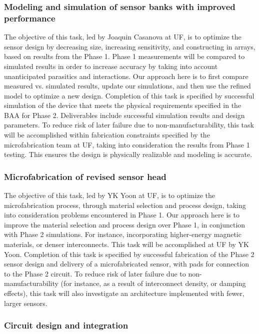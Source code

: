 \subsubsection{Modeling and simulation of sensor banks with improved performance}\label{sec:p2:em}

The objective of this task, led by Joaquin Casanova at UF, is to optimize the sensor design by decreasing size, increasing sensitivity, and constructing in arrays, based on results from the Phase 1. Phase 1 measurements will be compared to simulated results in order to increase accuracy by taking into account unanticipated parasitics and interactions. Our approach here is to first compare measured vs. simulated results, update our simulations, and then use the refined model to optimize a new design. Completion of this task is specified by successful simulation of the device that meets the physical requirements specified in the BAA for Phase 2. Deliverables include successful simulation results and design parameters. To reduce risk of later failure due to non-manufacturability, this task will be accomplished within fabrication constraints specified by the microfabrication team at UF, taking into consideration the results from Phase 1 testing. This ensures the design is physically realizable and modeling is accurate.

\subsubsection{Microfabrication of revised sensor head}\label{sec:p2:mf}

The objective of this task, led by YK Yoon at UF, is to optimize the microfabrication process, through material selection and process design, taking into consideration problems encountered in Phase 1. Our approach here is to improve the material selection and process design over Phase 1, in conjunction with Phase 2 simulations. For instance, incorporating higher-energy magnetic materials, or denser interconnects. This task will be accomplished at UF by YK Yoon. Completion of this task is specified by successful fabrication of the Phase 2 sensor design and delivery of a microfabricated sensor, with pads for connection to the Phase 2 circuit. To reduce risk of later failure due to non-manufacturability (for instance, as a result of interconnect density, or damping effects), this task will also investigate an architecture implemented with fewer, larger sensors.

\subsubsection{Circuit design and integration}\label{sec:p2:cir}


